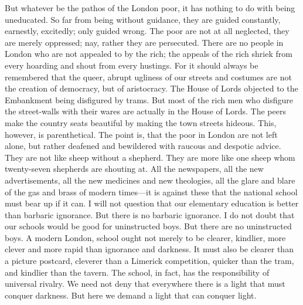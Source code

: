 \documentclass{book}
\begin{document}
But whatever be the pathos of the London poor, it has nothing to do with being uneducated. So far from being without guidance, they are guided constantly, earnestly, excitedly; only guided wrong. The poor are not at all neglected, they are merely oppressed; nay, rather they are persecuted. There are no people in London who are not appealed to by the rich; the appeals of the rich shriek from every hoarding and shout from every hustings. For it should always be remembered that the queer, abrupt ugliness of our streets and costumes are not the creation of democracy, but of aristocracy. The House of Lords objected to the Embankment being disfigured by trams. But most of the rich men who disfigure the street-walls with their wares are actually in the House of Lords. The peers make the country seats beautiful by making the town streets hideous. This, however, is parenthetical. The point is, that the poor in London are not left alone, but rather deafened and bewildered with raucous and despotic advice. They are not like sheep without a shepherd. They are more like one sheep whom twenty-seven shepherds are shouting at. All the newspapers, all the new advertisements, all the new medicines and new theologies, all the glare and blare of the gas and brass of modern times—it is against these that the national school must bear up if it can. I will not question that our elementary education is better than barbaric ignorance. But there is no barbaric ignorance. I do not doubt that our schools would be good for uninstructed boys. But there are no uninstructed boys. A modern London, school ought not merely to be clearer, kindlier, more clever and more rapid than ignorance and darkness. It must also be clearer than a picture postcard, cleverer than a Limerick competition, quicker than the tram, and kindlier than the tavern. The school, in fact, has the responsibility of universal rivalry. We need not deny that everywhere there is a light that must conquer darkness. But here we demand a light that can conquer light.
\end{document}
